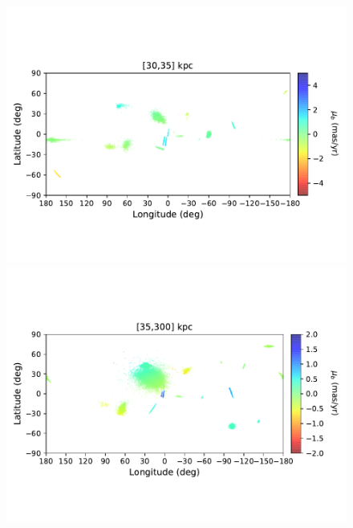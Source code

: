 \begin{figure}[h!]
\begin{center}
            \includegraphics[clip=true, trim = 0mm 20mm 0mm 20mm, width=\columnwidth]{images/PII_ensemble_LB_D30-35_PMB_new.pdf}
            \includegraphics[clip=true, trim = 0mm 20mm 0mm 20mm, width=\columnwidth]{images/PII_ensemble_LB_D35-300_PMB_new.pdf}


\end{center}
\end{figure}
